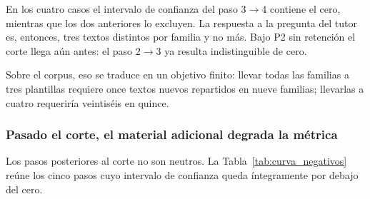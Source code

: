 \begin{table}[ht]
\centering
\caption{Aporte de cada plantilla adicional por familia (diferencia pareada de macro-F1, IC 95\%, 100 repeticiones, corpus de 149 notas)}
\label{tab:curva_pasos}
\end{table}

En los cuatro casos el intervalo de confianza del paso $3 \rightarrow 4$ contiene el cero, mientras que los dos anteriores lo excluyen. La respuesta a la pregunta del tutor es, entonces, tres textos distintos por familia y no más. Bajo P2 sin retención el corte llega aún antes: el paso $2 \rightarrow 3$ ya resulta indistinguible de cero.

Sobre el corpus, eso se traduce en un objetivo finito: llevar todas las familias a tres plantillas requiere once textos nuevos repartidos en nueve familias; llevarlas a cuatro requeriría veintiséis en quince.

\subsubsection*{Pasado el corte, el material adicional degrada la métrica}

Los pasos posteriores al corte no son neutros. La Tabla~\ref{tab:curva_negativos} reúne los cinco pasos cuyo intervalo de confianza queda íntegramente por debajo del cero.

